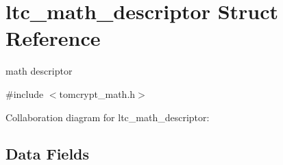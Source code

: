 \hypertarget{structltc__math__descriptor}{}\section{ltc\+\_\+math\+\_\+descriptor Struct Reference}
\label{structltc__math__descriptor}


math descriptor  




{\ttfamily \#include $<$tomcrypt\+\_\+math.\+h$>$}



Collaboration diagram for ltc\+\_\+math\+\_\+descriptor\+:
\subsection*{Data Fields}
